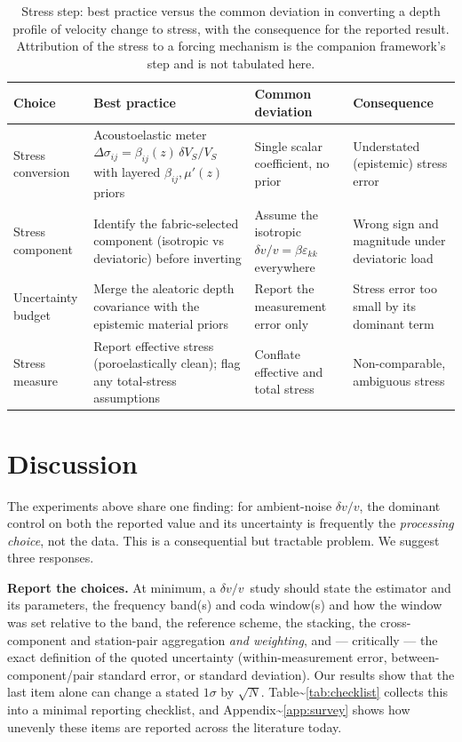 \documentclass[
  referee]{gji}
\providecommand{\dvv}{\ensuremath{\delta v/v}}
\begin{document}
\begin{table}
\footnotesize
\caption{Stress step: best practice versus the common deviation in converting a
depth profile of velocity change to stress, with the consequence for the reported
result. Attribution of the stress to a forcing mechanism is the companion
framework's step and is not tabulated here.}
\label{tab:bp-stress}
\begin{tabularx}{\textwidth}{@{}>{\raggedright\arraybackslash}p{2.6cm} L L L@{}}
\toprule
\textbf{Choice} & \textbf{Best practice} & \textbf{Common deviation} &
\textbf{Consequence} \\
\midrule
Stress conversion & Acoustoelastic meter $\Delta\sigma_{ij}=\beta_{ij}(z)\,\delta V_S/V_S$
with layered $\beta_{ij},\mu'(z)$ priors & Single scalar coefficient, no prior &
Understated (epistemic) stress error \\ \hline
Stress component & Identify the fabric-selected component (isotropic vs deviatoric)
before inverting & Assume the isotropic $\delta v/v=\beta\varepsilon_{kk}$
everywhere & Wrong sign and magnitude under deviatoric load \\ \hline
Uncertainty budget & Merge the aleatoric depth covariance with the epistemic
material priors & Report the measurement error only & Stress error too small by
its dominant term \\ \hline
Stress measure & Report effective stress (poroelastically clean); flag any
total-stress assumptions & Conflate effective and total stress &
Non-comparable, ambiguous stress \\
\bottomrule
\end{tabularx}
\end{table}

\section{Discussion}\label{sec:discussion}

The experiments above share one finding: for ambient-noise \dvv, the
dominant control on both the reported value and its uncertainty is
frequently the \emph{processing choice}, not the data. This is a
consequential but tractable problem. We suggest three responses.

\textbf{Report the choices.} At minimum, a \dvv~study should state the
estimator and its parameters, the frequency band(s) and coda window(s)
and how the window was set relative to the band, the reference scheme,
the stacking, the cross-component and station-pair aggregation \emph{and
weighting}, and --- critically --- the exact definition of the quoted
uncertainty (within-measurement error, between-component/pair standard
error, or standard deviation). Our results show that the last item alone
can change a stated \(1\sigma\) by \(\sqrt{N}\).
Table\textasciitilde{}\ref{tab:checklist} collects this into a minimal
reporting checklist, and Appendix\textasciitilde{}\ref{app:survey} shows
how unevenly these items are reported across the literature today.
\end{document}
